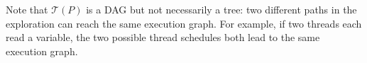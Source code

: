 \documentclass[acmsmall]{acmart}
\newcommand{\opw}{\mathsf{W}}
\newcommand{\opr}{\mathsf{R}}
\newcommand{\op}{\mathsf{op}}
\newcommand{\lab}{\mathsf{lab}}
\newcommand{\floc}{\mathsf{loc}}
\newcommand{\flab}{\mathsf{lab}}
\newcommand{\fval}{\mathsf{val}}
\newcommand{\ftid}{\mathsf{tid}}
\newcommand{\egraph}{\mathsf{EG}}
\newcommand{\scg}{\mathsf{SCG}}
\newcommand{\init}{\mathsf{init}}
\newcommand{\rf}[1]{{\textcolor{green!60!black}{\mathsf{rf}}_{#1}}}
\newcommand{\mo}[1]{{\textcolor{orange}{\mathsf{mo}}_{#1}}}
\newcommand{\po}[1]{{\textcolor{darkgray}{\mathsf{po}}_{#1}}}
\begin{document}
Note that $\mathcal{T}(P)$ is a DAG but not necessarily a tree: two 
different paths in the exploration can reach the same execution graph.
For example, if two threads each read a variable, the two possible thread schedules both lead to the same execution graph.

\end{document}
